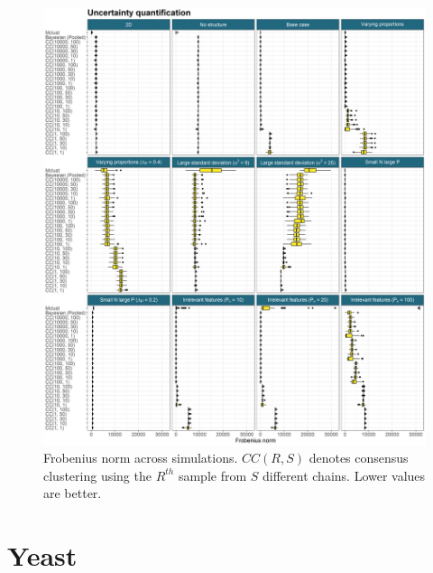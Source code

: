 \documentclass[]{article}
\begin{document}
\begin{figure} %
	\centering
	\includegraphics[scale=0.5]{./Images/Simulations/simulation_uncertainty.png}
	\caption{Frobenius norm across simulations. $CC(R, S)$ denotes consensus clustering using the $R^{th}$ sample from $S$ different chains. Lower values are better.}
	\label{fig:simUncertainty}
\end{figure}

\section{Yeast} \label{sec:yeast}
\end{document}
